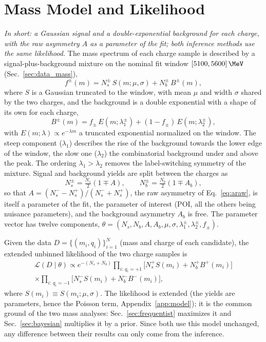 \section{Mass Model and Likelihood}
\label{sec:model}
\label{sec:bayes_model}
\emph{In short: a Gaussian signal and a double-exponential background for each charge, with the raw asymmetry $A$ as a parameter of the fit; both inference methods use the same likelihood.}
The mass spectrum of each charge sample is described by a signal-plus-background mixture on the nominal fit window $[5100,5600]\,\MeV$ (Sec.~\ref{sec:data_mass}),
\begin{equation}
f^{\pm}(m)=N_s^{\pm}\,S(m;\mu,\sigma)+N_b^{\pm}\,B^{\pm}(m),
\label{eq:mixture}
\end{equation}
where $S$ is a Gaussian truncated to the window, with mean $\mu$ and width $\sigma$ shared by the two charges, and the background is a double exponential with a shape of its own for each charge,
\[
B^{\pm}(m)=f_{\pm}\,E(m;\lambda_{1}^{\pm})+(1-f_{\pm})\,E(m;\lambda_{2}^{\pm}),
\]
with $E(m;\lambda)\propto e^{-\lambda m}$ a truncated exponential normalized on the window. The steep component ($\lambda_1$) describes the rise of the background towards the lower edge of the window, the slow one ($\lambda_2$) the combinatorial background under and above the peak. The ordering $\lambda_1>\lambda_2$ removes the label-switching symmetry of the mixture. Signal and background yields are split between the charges as
\[
N_s^{\pm}=\tfrac{N_s}{2}(1\mp A),\qquad N_b^{\pm}=\tfrac{N_b}{2}(1\mp A_b),
\]
so that $A=(N_s^--N_s^+)/(N_s^-+N_s^+)$, the raw asymmetry \Araw of Eq.~\eqref{eq:araw}, is itself a parameter of the fit, the parameter of interest (POI, all the others being nuisance parameters), and the background asymmetry $A_b$ is free. The parameter vector has twelve components, $\theta=(N_s,N_b,A,A_b,\mu,\sigma,\lambda_1^{\pm},\lambda_2^{\pm},f_{\pm})$.

Given the data $D=\{(m_i,q_i)\}_{i=1}^{N}$ (mass and charge of each candidate), the extended unbinned likelihood of the two charge samples is
\begin{multline}
\mathcal{L}(D\mid\theta)\propto e^{-(N_s+N_b)}
\prod_{i:\,q_i=+1}\Big[N_s^{+}S(m_i)+N_b^{+}B^{+}(m_i)\Big] \\
\times\prod_{i:\,q_i=-1}\Big[N_s^{-}S(m_i)+N_b^{-}B^{-}(m_i)\Big],
\label{eq:likelihood}
\end{multline}
where $S(m_i)\equiv S(m_i;\mu,\sigma)$. The likelihood is extended (the yields are parameters, hence the Poisson term, Appendix~\ref{app:model}); it is the common ground of the two mass analyses: Sec.~\ref{sec:frequentist} maximizes it and Sec.~\ref{sec:bayesian} multiplies it by a prior. Since both use this model unchanged, any difference between their results can only come from the inference.

